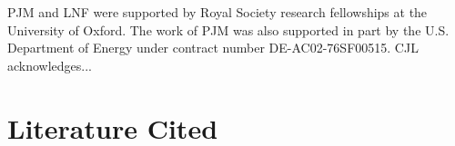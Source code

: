 \documentclass{ar2e}
\begin{document}
PJM and LNF were supported by Royal Society research fellowships at the
University of Oxford. The work of PJM was also supported in part  by the U.S.
Department of Energy under contract number DE-AC02-76SF00515.
%
CJL acknowledges...



\section{Literature Cited}





\end{document}
